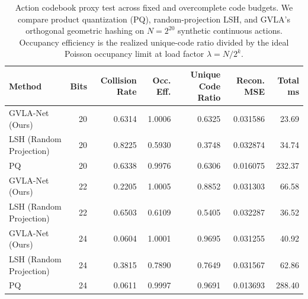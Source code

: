 \begin{table}[t]
\centering
\caption{Action codebook proxy test across fixed and overcomplete code budgets. We compare product quantization (PQ), random-projection LSH, and GVLA's orthogonal geometric hashing on $N=2^{20}$ synthetic continuous actions. Occupancy efficiency is the realized unique-code ratio divided by the ideal Poisson occupancy limit at load factor $\lambda = N / 2^k$.}
\label{tab:proxy_collision_test}
\scriptsize
\begin{tabular}{lrrrrrr}
\toprule
Method & Bits & Collision Rate & Occ. Eff. & Unique Code Ratio & Recon. MSE & Total ms \\
\midrule
GVLA-Net (Ours) & 20 & 0.6314 & 1.0006 & 0.6325 & 0.031586 & 23.69 \\
LSH (Random Projection) & 20 & 0.8225 & 0.5930 & 0.3748 & 0.032874 & 34.74 \\
PQ & 20 & 0.6338 & 0.9976 & 0.6306 & 0.016075 & 232.37 \\
GVLA-Net (Ours) & 22 & 0.2205 & 1.0005 & 0.8852 & 0.031303 & 66.58 \\
LSH (Random Projection) & 22 & 0.6503 & 0.6109 & 0.5405 & 0.032287 & 36.52 \\
GVLA-Net (Ours) & 24 & 0.0604 & 1.0001 & 0.9695 & 0.031255 & 40.92 \\
LSH (Random Projection) & 24 & 0.3815 & 0.7890 & 0.7649 & 0.031567 & 62.86 \\
PQ & 24 & 0.0611 & 0.9997 & 0.9691 & 0.013693 & 288.40 \\
\bottomrule
\end{tabular}
\end{table}
